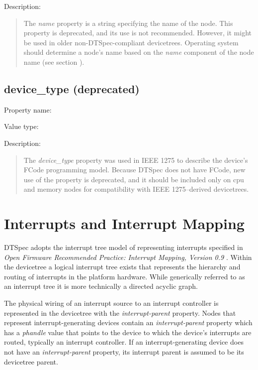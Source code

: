 \documentclass[a4paper,10pt,oneside]{sphinxmanual}
\begin{document}
Description:
\begin{quote}

The \emph{name} property is a string specifying the name of the node. This
property is deprecated, and its use is not recommended. However, it
might be used in older non-DTSpec-compliant devicetrees. Operating
system should determine a node’s name based on the \emph{name} component of
the node name (see section {\hyperref[devicetree\string-basics:sect\string-node\string-names]{}}).
\end{quote}


\subsection{device\_type (deprecated)}
\label{devicetree-basics:device-type-deprecated}
Property name: 

Value type: 

Description:
\begin{quote}

The \emph{device\_type} property was used in IEEE 1275 to describe the
device’s FCode programming model. Because DTSpec does not have FCode, new
use of the property is deprecated, and it should be included only on cpu
and memory nodes for compatibility with IEEE 1275–derived devicetrees.
\end{quote}


\section{Interrupts and Interrupt Mapping}
\label{devicetree-basics:sect-interrupts}\label{devicetree-basics:interrupts-and-interrupt-mapping}
DTSpec adopts the interrupt tree model of representing interrupts
specified in \emph{Open Firmware Recommended Practice: Interrupt Mapping,
Version 0.9} \label{devicetree-basics:id1}{\hyperref[references:b7]{\crossref{{[}b7{]}}}}. Within the devicetree a logical interrupt tree exists
that represents the hierarchy and routing of interrupts in the platform
hardware. While generically referred to as an interrupt tree it is more
technically a directed acyclic graph.

The physical wiring of an interrupt source to an interrupt controller is
represented in the devicetree with the \emph{interrupt-parent} property.
Nodes that represent interrupt-generating devices contain an
\emph{interrupt-parent} property which has a \emph{phandle} value that points to
the device to which the device’s interrupts are routed, typically an
interrupt controller. If an interrupt-generating device does not have an
\emph{interrupt-parent} property, its interrupt parent is assumed to be its
devicetree parent.
\end{document}
